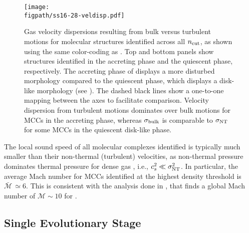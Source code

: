 \IfFileExists{emulateapjlegacy.cls}{\documentclass[iop]{emulateapjlegacy}}{\documentclass[iop]{emulateapj}}
\def\figpath{./Fig}
\begin{document}
\begin{figure}
\centering
\texttt{[image: \\figpath/ss16-28-veldisp.pdf]}
\caption{Gas velocity dispersions resulting from bulk versus turbulent motions for molecular structures 
identified across all $n_{\rm cut}$, as shown using the same color-coding as .
%
Top and bottom panels show structures identified in the accreting phase and the quiescent phase, respectively.
The accreting phase of \flower displays a more disturbed morphology compared to the quiescent phase, which displays a disk-like morphology (see ).
%
The dashed black lines show a one-to-one mapping between the axes to facilitate comparison. 
%
Velocity dispersion from turbulent motions dominates over bulk motions for MCCs in the accreting phase, whereas 
$\sigma_{\rm bulk}$ is comparable to $\sigma_{\rm NT}$ for some MCCs in the quiescent disk-like phase.
\label{fig:vv}}
\vspace{0.5em}
\end{figure}

The local sound speed of all molecular complexes identified is typically much smaller than their non-thermal (turbulent) velocities,
as non-thermal pressure dominates thermal pressure for dense gas \citep{Pallottini17b}, i.e., $c_s^2 \ll \sigma_{\rm NT}^2$. In particular, the average Mach number for MCCs identified at the highest density threshold is $\bar{\mathcal{M}}\,\simeq6$. This is consistent with the analysis done in \citet{Vallini18a}, that finds a global Mach number of $\mathcal{M} \sim 10$ for \flower.

\subsection{Single Evolutionary Stage}  \label{sec:singless}
\end{document}
